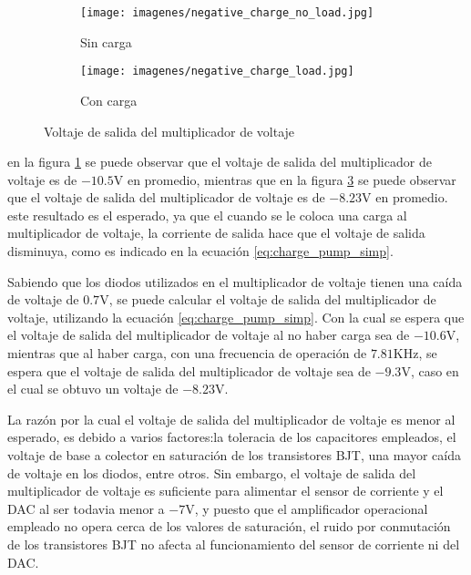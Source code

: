     \begin{figure}[H]
        \centering

        \begin{subfigure}{0.45\textwidth}
            \centering
            \texttt{[image: imagenes/negative\_charge\_no\_load.jpg]}
            \caption{Sin carga}
            \label{fig:out_multiplicador_no_load}
        \end{subfigure}
        \begin{subfigure}{0.45\textwidth}
            \centering
            \texttt{[image: imagenes/negative\_charge\_load.jpg]}
            \caption{Con carga}
            \label{fig:out_multiplicador_load}
        \end{subfigure}
        \caption{Voltaje de salida del multiplicador de voltaje}
    \end{figure}
    
    en la figura \ref{fig:out_multiplicador_no_load} se puede observar que
    el voltaje de salida del multiplicador de voltaje es de $-10.5\text{V}$ en 
    promedio, mientras que en la figura \ref{fig:out_multiplicador_load} se
    puede observar que el voltaje de salida del multiplicador de voltaje es de
    $-8.23\text{V}$ en promedio. este resultado es el esperado, ya que el
    cuando se le coloca una carga al multiplicador de voltaje, la corriente
    de salida hace que el voltaje de salida disminuya, como es indicado en la 
    ecuación \ref{eq:charge_pump_simp}.

    Sabiendo que los diodos utilizados en el multiplicador de voltaje tienen
    una caída de voltaje de $0.7\text{V}$, se puede calcular el voltaje de
    salida del multiplicador de voltaje, utilizando la ecuación \ref{eq:charge_pump_simp}.
    Con la cual se espera que el voltaje de salida del multiplicador de voltaje
    al no haber carga sea de $-10.6\text{V}$, mientras que al haber carga, con
    una frecuencia de operación de $7.81\text{KHz}$, se espera que el voltaje
    de salida del multiplicador de voltaje sea de $-9.3\text{V}$, caso en el 
    cual se obtuvo un voltaje de $-8.23\text{V}$.
    
    La razón por la cual el voltaje de salida del multiplicador de voltaje es menor al esperado,
     es debido a varios factores:la toleracia de los capacitores empleados, el voltaje de 
    base a colector en saturación de los transistores BJT, una mayor caída de voltaje en los diodos,
    entre otros. Sin embargo, el voltaje de salida del multiplicador de voltaje
    es suficiente para alimentar el sensor de corriente y el DAC al ser todavia
    menor a $-7\text{V}$, y puesto que el amplificador operacional empleado no 
    opera cerca de los valores de saturación, el ruido por conmutación
    de los transistores BJT no afecta al funcionamiento del sensor de corriente
    ni del DAC.



